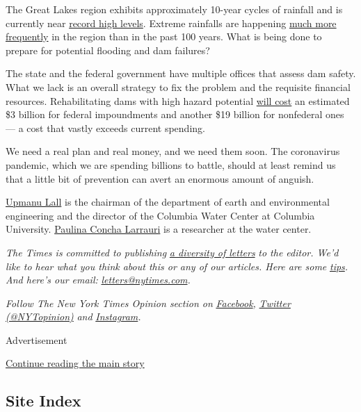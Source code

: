 The Great Lakes region exhibits approximately 10-year cycles of rainfall
and is currently near
\href{https://www.glerl.noaa.gov/data/wlevels/levels.html\#observations}{record
high levels}. Extreme rainfalls are happening
\href{https://michigan-weather-center.org/weather-extremes-pt-2}{much
more frequently} in the region than in the past 100 years. What is being
done to prepare for potential flooding and dam failures?

The state and the federal government have multiple offices that assess
dam safety. What we lack is an overall strategy to fix the problem and
the requisite financial resources. Rehabilitating dams with high hazard
potential \href{https://fas.org/sgp/crs/homesec/IF10606.pdf}{will cost}
an estimated \$3 billion for federal impoundments and another \$19
billion for nonfederal ones --- a cost that vastly exceeds current
spending.

We need a real plan and real money, and we need them soon. The
coronavirus pandemic, which we are spending billions to battle, should
at least remind us that a little bit of prevention can avert an enormous
amount of anguish.

\href{http://www.columbia.edu/~ula2/}{Upmanu Lall} is the chairman of
the department of earth and environmental engineering and the director
of the Columbia Water Center at Columbia University.
\href{https://www.earth.columbia.edu/users/profile/paulina-concha-larrauri}{Paulina
Concha Larrauri} is a researcher at the water center.

\emph{The Times is committed to publishing}
\href{https://www.nytimes.com/2019/01/31/opinion/letters/letters-to-editor-new-york-times-women.html}{\emph{a
diversity of letters}} \emph{to the editor. We'd like to hear what you
think about this or any of our articles. Here are some}
\href{https://help.nytimes.com/hc/en-us/articles/115014925288-How-to-submit-a-letter-to-the-editor}{\emph{tips}}\emph{.
And here's our email:}
\href{mailto:letters@nytimes.com}{\emph{letters@nytimes.com}}\emph{.}

\emph{Follow The New York Times Opinion section on}
\href{https://www.facebook.com/nytopinion}{\emph{Facebook}}\emph{,}
\href{http://twitter.com/NYTOpinion}{\emph{Twitter (@NYTopinion)}}
\emph{and}
\href{https://www.instagram.com/nytopinion/}{\emph{Instagram}}\emph{.}

Advertisement

\protect\hyperlink{after-bottom}{Continue reading the main story}

\hypertarget{site-index}{%
\subsection{Site Index}\label{site-index}}

